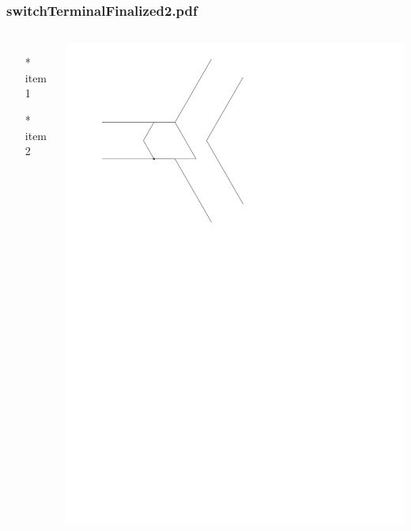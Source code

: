 \begin{frame} \frametitle{switchTerminalFinalized2.pdf}
    \begin{columns}[c]
        \begin{itemize}
            \item[*] item 1
            \item[*] item 2
        \end{itemize}
        \begin{minipage}{\linewidth}
            \begin{center}
            \includegraphics[width=.9\textwidth]{graphics/switchTerminalFinalized2.pdf}
            \label{gfx:switchTerminalFinalized2.pdf}
            \end{center}
        \end{minipage}
    \end{columns}
\end{frame}
